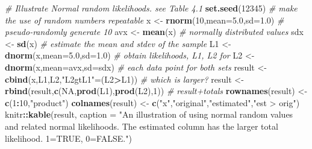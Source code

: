\documentclass[
  lang=cn,
  11pt,
  scheme=chinese,
  chinesefont=nofont,
  citestyle=gb7714-2015,
  bibstyle=gb7714-2015]{elegantbook}
\newenvironment{Shaded}{\begin{snugshade}}{\end{snugshade}}
\newcommand{\AttributeTok}[1]{\textcolor[rgb]{0.13,0.29,0.53}{#1}}
\newcommand{\CommentTok}[1]{\textcolor[rgb]{0.56,0.35,0.01}{\textit{#1}}}
\newcommand{\ConstantTok}[1]{\textcolor[rgb]{0.56,0.35,0.01}{#1}}
\newcommand{\DecValTok}[1]{\textcolor[rgb]{0.00,0.00,0.81}{#1}}
\newcommand{\FloatTok}[1]{\textcolor[rgb]{0.00,0.00,0.81}{#1}}
\newcommand{\FunctionTok}[1]{\textcolor[rgb]{0.13,0.29,0.53}{\textbf{#1}}}
\newcommand{\NormalTok}[1]{#1}
\newcommand{\OtherTok}[1]{\textcolor[rgb]{0.56,0.35,0.01}{#1}}
\newcommand{\SpecialCharTok}[1]{\textcolor[rgb]{0.81,0.36,0.00}{\textbf{#1}}}
\newcommand{\StringTok}[1]{\textcolor[rgb]{0.31,0.60,0.02}{#1}}
\begin{document}
\begin{Shaded}
\begin{Highlighting}[]
 \CommentTok{\# Illustrate Normal random likelihoods. see Table 4.1  }
\FunctionTok{set.seed}\NormalTok{(}\DecValTok{12345}\NormalTok{)       }\CommentTok{\# make the use of random numbers repeatable  }
\NormalTok{x }\OtherTok{\textless{}{-}} \FunctionTok{rnorm}\NormalTok{(}\DecValTok{10}\NormalTok{,}\AttributeTok{mean=}\FloatTok{5.0}\NormalTok{,}\AttributeTok{sd=}\FloatTok{1.0}\NormalTok{)      }\CommentTok{\# pseudo{-}randomly generate 10   }
\NormalTok{avx }\OtherTok{\textless{}{-}} \FunctionTok{mean}\NormalTok{(x)                      }\CommentTok{\# normally distributed values  }
\NormalTok{sdx }\OtherTok{\textless{}{-}} \FunctionTok{sd}\NormalTok{(x)          }\CommentTok{\# estimate the mean and stdev of the sample            }
\NormalTok{L1 }\OtherTok{\textless{}{-}} \FunctionTok{dnorm}\NormalTok{(x,}\AttributeTok{mean=}\FloatTok{5.0}\NormalTok{,}\AttributeTok{sd=}\FloatTok{1.0}\NormalTok{)   }\CommentTok{\# obtain likelihoods, L1, L2 for   }
\NormalTok{L2 }\OtherTok{\textless{}{-}} \FunctionTok{dnorm}\NormalTok{(x,}\AttributeTok{mean=}\NormalTok{avx,}\AttributeTok{sd=}\NormalTok{sdx)    }\CommentTok{\# each data point for both sets  }
\NormalTok{result }\OtherTok{\textless{}{-}} \FunctionTok{cbind}\NormalTok{(x,L1,L2,}\StringTok{"L2gtL1"}\OtherTok{=}\NormalTok{(L2}\SpecialCharTok{\textgreater{}}\NormalTok{L1))      }\CommentTok{\# which is larger?  }
\NormalTok{result }\OtherTok{\textless{}{-}} \FunctionTok{rbind}\NormalTok{(result,}\FunctionTok{c}\NormalTok{(}\ConstantTok{NA}\NormalTok{,}\FunctionTok{prod}\NormalTok{(L1),}\FunctionTok{prod}\NormalTok{(L2),}\DecValTok{1}\NormalTok{)) }\CommentTok{\# result+totals  }
\FunctionTok{rownames}\NormalTok{(result) }\OtherTok{\textless{}{-}} \FunctionTok{c}\NormalTok{(}\DecValTok{1}\SpecialCharTok{:}\DecValTok{10}\NormalTok{,}\StringTok{"product"}\NormalTok{)  }
\FunctionTok{colnames}\NormalTok{(result) }\OtherTok{\textless{}{-}} \FunctionTok{c}\NormalTok{(}\StringTok{"x"}\NormalTok{,}\StringTok{"original"}\NormalTok{,}\StringTok{"estimated"}\NormalTok{,}\StringTok{"est \textgreater{} orig"}\NormalTok{)  }
\NormalTok{knitr}\SpecialCharTok{::}\FunctionTok{kable}\NormalTok{(result, }\AttributeTok{caption =} \StringTok{"An illustration of using normal random values and related normal likelihoods. The estimated column has the larger total likelihood. 1=TRUE, 0=FALSE."}\NormalTok{)}
\end{Highlighting}
\end{Shaded}
\end{document}
